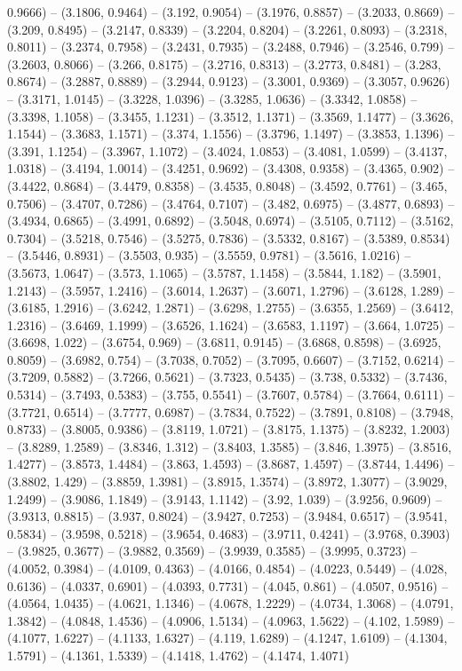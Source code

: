 0.9666) -- (3.1806, 0.9464) -- (3.192, 0.9054) -- (3.1976, 0.8857) -- (3.2033, 0.8669) -- (3.209, 0.8495) -- (3.2147, 0.8339) -- (3.2204, 0.8204) -- (3.2261, 0.8093) -- (3.2318, 0.8011) -- (3.2374, 0.7958) -- (3.2431, 0.7935) -- (3.2488, 0.7946) -- (3.2546, 0.799) -- (3.2603, 0.8066) -- (3.266, 0.8175) -- (3.2716, 0.8313) -- (3.2773, 0.8481) -- (3.283, 0.8674) -- (3.2887, 0.8889) -- (3.2944, 0.9123) -- (3.3001, 0.9369) -- (3.3057, 0.9626) -- (3.3171, 1.0145) -- (3.3228, 1.0396) -- (3.3285, 1.0636) -- (3.3342, 1.0858) -- (3.3398, 1.1058) -- (3.3455, 1.1231) -- (3.3512, 1.1371) -- (3.3569, 1.1477) -- (3.3626, 1.1544) -- (3.3683, 1.1571) -- (3.374, 1.1556) -- (3.3796, 1.1497) -- (3.3853, 1.1396) -- (3.391, 1.1254) -- (3.3967, 1.1072) -- (3.4024, 1.0853) -- (3.4081, 1.0599) -- (3.4137, 1.0318) -- (3.4194, 1.0014) -- (3.4251, 0.9692) -- (3.4308, 0.9358) -- (3.4365, 0.902) -- (3.4422, 0.8684) -- (3.4479, 0.8358) -- (3.4535, 0.8048) -- (3.4592, 0.7761) -- (3.465, 0.7506) -- (3.4707, 0.7286) -- (3.4764, 0.7107) -- (3.482, 0.6975) -- (3.4877, 0.6893) -- (3.4934, 0.6865) -- (3.4991, 0.6892) -- (3.5048, 0.6974) -- (3.5105, 0.7112) -- (3.5162, 0.7304) -- (3.5218, 0.7546) -- (3.5275, 0.7836) -- (3.5332, 0.8167) -- (3.5389, 0.8534) -- (3.5446, 0.8931) -- (3.5503, 0.935) -- (3.5559, 0.9781) -- (3.5616, 1.0216) -- (3.5673, 1.0647) -- (3.573, 1.1065) -- (3.5787, 1.1458) -- (3.5844, 1.182) -- (3.5901, 1.2143) -- (3.5957, 1.2416) -- (3.6014, 1.2637) -- (3.6071, 1.2796) -- (3.6128, 1.289) -- (3.6185, 1.2916) -- (3.6242, 1.2871) -- (3.6298, 1.2755) -- (3.6355, 1.2569) -- (3.6412, 1.2316) -- (3.6469, 1.1999) -- (3.6526, 1.1624) -- (3.6583, 1.1197) -- (3.664, 1.0725) -- (3.6698, 1.022) -- (3.6754, 0.969) -- (3.6811, 0.9145) -- (3.6868, 0.8598) -- (3.6925, 0.8059) -- (3.6982, 0.754) -- (3.7038, 0.7052) -- (3.7095, 0.6607) -- (3.7152, 0.6214) -- (3.7209, 0.5882) -- (3.7266, 0.5621) -- (3.7323, 0.5435) -- (3.738, 0.5332) -- (3.7436, 0.5314) -- (3.7493, 0.5383) -- (3.755, 0.5541) -- (3.7607, 0.5784) -- (3.7664, 0.6111) -- (3.7721, 0.6514) -- (3.7777, 0.6987) -- (3.7834, 0.7522) -- (3.7891, 0.8108) -- (3.7948, 0.8733) -- (3.8005, 0.9386) -- (3.8119, 1.0721) -- (3.8175, 1.1375) -- (3.8232, 1.2003) -- (3.8289, 1.2589) -- (3.8346, 1.312) -- (3.8403, 1.3585) -- (3.846, 1.3975) -- (3.8516, 1.4277) -- (3.8573, 1.4484) -- (3.863, 1.4593) -- (3.8687, 1.4597) -- (3.8744, 1.4496) -- (3.8802, 1.429) -- (3.8859, 1.3981) -- (3.8915, 1.3574) -- (3.8972, 1.3077) -- (3.9029, 1.2499) -- (3.9086, 1.1849) -- (3.9143, 1.1142) -- (3.92, 1.039) -- (3.9256, 0.9609) -- (3.9313, 0.8815) -- (3.937, 0.8024) -- (3.9427, 0.7253) -- (3.9484, 0.6517) -- (3.9541, 0.5834) -- (3.9598, 0.5218) -- (3.9654, 0.4683) -- (3.9711, 0.4241) -- (3.9768, 0.3903) -- (3.9825, 0.3677) -- (3.9882, 0.3569) -- (3.9939, 0.3585) -- (3.9995, 0.3723) -- (4.0052, 0.3984) -- (4.0109, 0.4363) -- (4.0166, 0.4854) -- (4.0223, 0.5449) -- (4.028, 0.6136) -- (4.0337, 0.6901) -- (4.0393, 0.7731) -- (4.045, 0.861) -- (4.0507, 0.9516) -- (4.0564, 1.0435) -- (4.0621, 1.1346) -- (4.0678, 1.2229) -- (4.0734, 1.3068) -- (4.0791, 1.3842) -- (4.0848, 1.4536) -- (4.0906, 1.5134) -- (4.0963, 1.5622) -- (4.102, 1.5989) -- (4.1077, 1.6227) -- (4.1133, 1.6327) -- (4.119, 1.6289) -- (4.1247, 1.6109) -- (4.1304, 1.5791) -- (4.1361, 1.5339) -- (4.1418, 1.4762) -- (4.1474, 1.4071) 